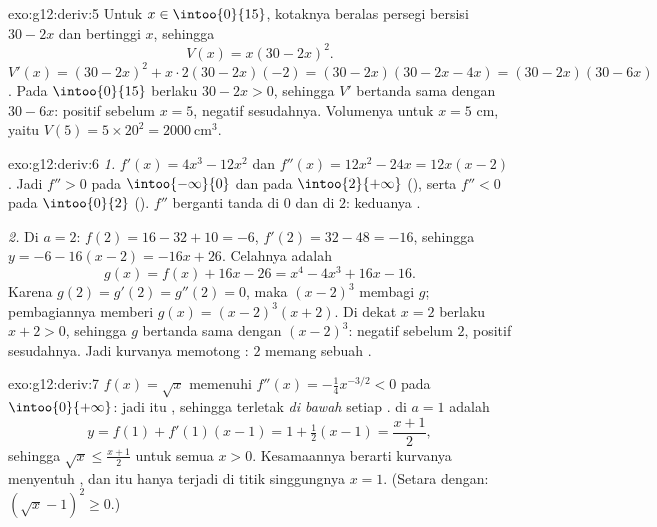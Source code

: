\begin{solution}{exo:g12:deriv:5}
Untuk $x \in \intoo{0}{15}$, kotaknya beralas persegi bersisi $30 - 2x$ dan
bertinggi $x$, sehingga
\[
V(x) = x(30 - 2x)^2 .
\]
$V'(x) = (30-2x)^2 + x \cdot 2(30-2x)(-2) = (30-2x)(30 - 2x - 4x)
= (30-2x)(30-6x)$. Pada $\intoo{0}{15}$ berlaku $30 - 2x > 0$, sehingga $V'$
bertanda sama dengan $30 - 6x$: positif sebelum $x = 5$, negatif sesudahnya.
Volumenya  untuk $x = 5$ cm, yaitu $V(5) = 5 \times 20^2 = 2000\ \text{cm}^3$.
\end{solution}

\begin{solution}{exo:g12:deriv:6}
\emph{1.} $f'(x) = 4x^3 - 12x^2$ dan $f''(x) = 12x^2 - 24x = 12x(x-2)$.
Jadi $f'' > 0$ pada $\intoo{-\infty}{0}$ dan pada $\intoo{2}{+\infty}$ (),
serta $f'' < 0$ pada $\intoo{0}{2}$ (). $f''$ berganti tanda di $0$ dan
di $2$: keduanya .

\emph{2.} Di $a = 2$: $f(2) = 16 - 32 + 10 = -6$, $f'(2) = 32 - 48 = -16$,
sehingga  $y = -6 - 16(x-2) = -16x + 26$. Celahnya adalah
\[
g(x) = f(x) + 16x - 26 = x^4 - 4x^3 + 16x - 16 .
\]
Karena $g(2) = g'(2) = g''(2) = 0$, maka $(x-2)^3$ membagi $g$; pembagiannya
memberi $g(x) = (x-2)^3(x+2)$. Di dekat $x = 2$ berlaku $x + 2 > 0$, sehingga
$g$ bertanda sama dengan $(x-2)^3$: negatif sebelum $2$, positif sesudahnya.
Jadi kurvanya memotong : $2$ memang sebuah .
\end{solution}

\begin{solution}{exo:g12:deriv:7}
 $f(x) = \sqrt{x}$ memenuhi
$f''(x) = -\frac{1}{4}x^{-3/2} < 0$ pada $\intoo{0}{+\infty}$: jadi  itu
, sehingga  terletak \emph{di bawah} setiap .
 di $a = 1$ adalah
\[
y = f(1) + f'(1)(x - 1) = 1 + \tfrac12 (x-1) = \frac{x+1}{2},
\]
sehingga $\sqrt{x} \leq \frac{x+1}{2}$ untuk semua $x > 0$. Kesamaannya berarti
kurvanya menyentuh , dan itu hanya terjadi di titik singgungnya
$x = 1$. (Setara dengan: $\left(\sqrt x - 1\right)^2 \geq 0$.)
\end{solution}

